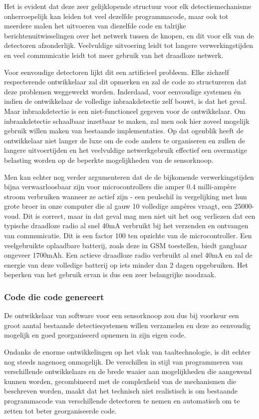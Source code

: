 \documentclass[DIV=calc,paper=a4,fontsize=11pt,twocolumn,draft]{scrartcl}
\newcommand{\heading}[1]{
\subsubsection*{#1}
\vspace{-2mm}
}
\begin{document}
Het is evident dat deze zeer gelijklopende structuur voor elk
detectiemechanisme onherroepelijk kan leiden tot veel dezelfde programmacode,
maar ook tot meerdere malen het uitvoeren van diezelfde code en talrijke
berichtenuitwisselingen over het netwerk tussen de knopen, en dit voor elk van
de detectoren afzonderlijk. Veelvuldige uitvoering leidt tot langere
verwerkingstijden en veel communicatie leidt tot meer gebruik van het draadloze
netwerk.

Voor eenvoudige detectoren lijkt dit een artificieel probleem. Elke zichzelf
respecterende ontwikkelaar zal dit opmerken en zal de code zo structureren dat
deze problemen weggewerkt worden. Inderdaad, voor eenvoudige systemen \'en
indien de ontwikkelaar de volledige inbraakdetectie zelf bouwt, is dat het
geval. Maar inbraakdetectie is een niet-functioneel gegeven voor de
ontwikkelaar. Om inbraakdetectie schaalbaar inzetbaar te maken, zal men ook
hier zoveel mogelijk gebruik willen maken van bestaande implementaties. Op dat
ogenblik heeft de ontwikkelaar niet langer de luxe om de code anders te
organiseren en zullen de langere uitvoertijden en het veelvuldige
netwerkgebruik effectief een overmatige belasting worden op de beperkte
mogelijkheden van de sensorknoop.

Men kan echter nog verder argumenteren dat de de bijkomende verwerkingstijden
bijna verwaarloosbaar zijn voor microcontrollers die amper 0.4 milli-amp\`ere
stroom verbruiken wanneer ze actief zijn - een peulschil in vergelijking met
hun grote broer in onze computer die al gauw 10 volledige amp\`eres vraagt, een
25000-voud. Dit is correct, maar in dat geval mag men niet uit het oog
verliezen dat een typische draadloze radio al snel 40mA verbruikt bij het
verzenden en ontvangen van communicatie. Dit is een factor 100 ten opzichte van
de microcontroller. Een veelgebruikte oplaadbare batterij, zoals deze in GSM
toestellen, biedt gangbaar ongeveer 1700mAh. Een actieve draadloze radio
verbruikt al snel 40mA en zal de energie van deze volledige batterij op iets
minder dan 2 dagen opgebruiken. Het beperken van het gebruik ervan is dus een
zeer belangrijke noodzaak.

\heading{Code die code genereert}

De ontwikkelaar van software voor een sensorknoop zou dus bij voorkeur een
groot aantal bestaande detectiesystemen willen verzamelen en deze zo eenvoudig
mogelijk en goed georganiseerd opnemen in zijn eigen code.

Ondanks de enorme ontwikkelingen op het vlak van taaltechnologie, is dit echter
nog steeds nagenoeg onmogelijk. De verschillen in stijl van programmeren van
verschillende ontwikkelaars en de brede waaier aan mogelijkheden die aangewend
kunnen worden, gecombineerd met de complexheid van de mechanismen die
beschreven worden, maakt dat het technisch niet realistisch is om bestaande
programmacode van verschillende detectoren te nemen en automatisch om te zetten
tot beter georganiseerde code.
\end{document}
